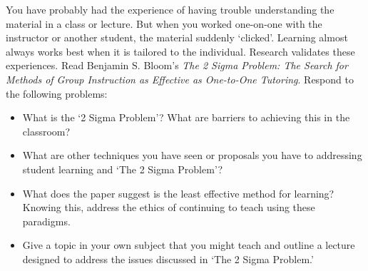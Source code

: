\documentclass[11pt,letterpaper]{article}
\begin{document}

You have probably had the experience of having trouble understanding the material in a class or lecture. But when you worked one-on-one with the instructor or another student, the material suddenly `clicked'. Learning almost always works best when it is tailored to the individual. Research validates these experiences. Read Benjamin S. Bloom's \textit{The 2 Sigma Problem: The Search for Methods of Group Instruction as Effective as One-to-One Tutoring}. Respond to the following problems:
	\begin{itemize}
	\item What is the `2 Sigma Problem'? What are barriers to achieving this in the classroom?
	\item What are other techniques you have seen or proposals you have to addressing student learning and `The 2 Sigma Problem'? 
	\item What does the paper suggest is the least effective method for learning? Knowing this, address the ethics of continuing to teach using these paradigms. 
	\item Give a topic in your own subject that you might teach and outline a lecture designed to address the issues discussed in `The 2 Sigma Problem.' 
	\end{itemize}

\newpage

\phantom{.}
\end{document}

